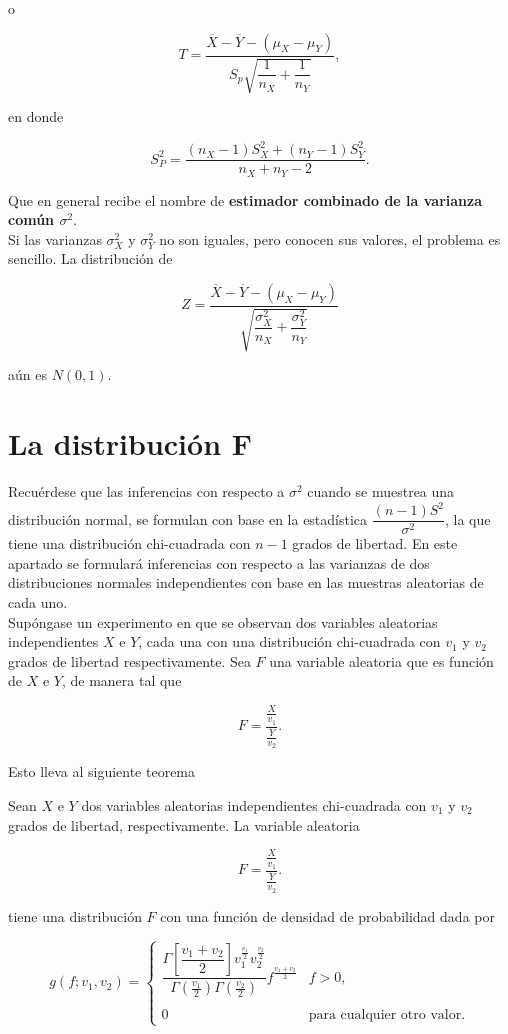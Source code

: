 o

\begin{tcolorbox}
    $$T=\dfrac{\overline{X}-\overline{Y}-\left(\mu_X-\mu_Y\right)}{S_p\sqrt{\dfrac{1}{n_X}+\dfrac{1}{n_Y}}},$$
\end{tcolorbox}

en donde 

$$S_P^2=\dfrac{\left(n_X-1\right)S_X^2+\left(n_Y-1\right)S_Y^2}{n_X+n_Y-2}.$$

Que en general recibe el nombre de \textbf{estimador combinado de la varianza común \boldmath $\sigma^2$}. \\

Si las varianzas $\sigma_X^2$ y $\sigma_Y^2$ no son iguales, pero conocen sus valores, el problema es sencillo. La distribución de
\begin{tcolorbox}
    $$Z=\dfrac{\overline{X}-\overline{Y}-\left(\mu_X-\mu_Y\right)}{\sqrt{\dfrac{\sigma_X^2}{n_X}+\dfrac{\sigma_Y^2}{n_Y}}}$$
\end{tcolorbox}

aún es $N(0,1)$. 


\section{La distribución F}

Recuérdese que las inferencias con respecto a $\sigma^2$ cuando se muestrea una distribución normal, se formulan con base en la estadística $\dfrac{(n-1)S^2}{\sigma^2}$, la que tiene una distribución chi-cuadrada con $n-1$ grados de libertad. En este apartado se formulará inferencias con respecto a las varianzas de dos distribuciones normales independientes con base en las muestras aleatorias de cada uno.\\

Supóngase un experimento en que se observan dos variables aleatorias independientes $X$ e $Y$, cada una con una distribución chi-cuadrada con $v_1$ y $v_2$ grados de libertad respectivamente. Sea $F$ una variable aleatoria que es función de $X$ e $Y$, de manera tal que

$$F=\dfrac{\frac{X}{v_1}}{\frac{Y}{v_2}}.$$

Esto lleva al siguiente teorema

\begin{teo}
    Sean $X$ e $Y$ dos variables aleatorias independientes chi-cuadrada con $v_1$ y $v_2$ grados de libertad, respectivamente. La variable aleatoria

$$F=\dfrac{\frac{X}{v_1}}{\frac{Y}{v_2}}.$$

tiene una distribución $F$ con una función de densidad de probabilidad dada por

$$
g\left(f;v_1,v_2\right) = 
\left\{
    \begin{array}{ll}
	\dfrac{\Gamma\left[\dfrac{v_1+v_2}{2}\right]v_1^{\frac{v_1}{2}}v_2^{\frac{v_2}{2}}}{\Gamma\left(\frac{v_1}{2}\right)\Gamma\left(\frac{v_2}{2}\right)}f^{\frac{v_1+v_2}{2}} & f>0,\\\\
	0 & \mbox{para cualquier otro valor}.
    \end{array}
\right.
$$
\end{teo}

